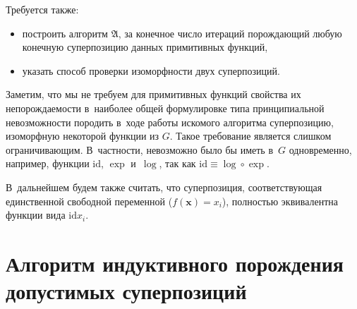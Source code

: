 \documentclass[12pt,a4paper]{article}
\begin{document}
Требуется также:
\begin{itemize}
  \item построить алгоритм $\mathfrak{A}$, за конечное число итераций
	порождающий любую конечную суперпозицию данных примитивных функций,
  \item указать способ проверки изоморфности двух суперпозиций.
\end{itemize}

Заметим, что мы не требуем для примитивных функций свойства их
непорождаемости в~наиболее общей формулировке типа принципиальной
невозможности породить в~ходе работы искомого алгоритма суперпозицию,
изоморфную некоторой функции из $G$. Такое требование является слишком
ограничивающим. В~частности, невозможно было бы иметь в~$G$ одновременно,
например, функции $\text{id}$, $\exp$ и~$\log$, так как
$\text{id} \equiv \log \circ \exp$.

В~дальнейшем будем также считать, что суперпозиция, соответствующая
единственной свободной переменной ($f(\mathbf{x}) = x_i$), полностью
эквивалентна функции вида $\text{id} x_i$.

\section{Алгоритм индуктивного порождения допустимых суперпозиций}
\end{document}
